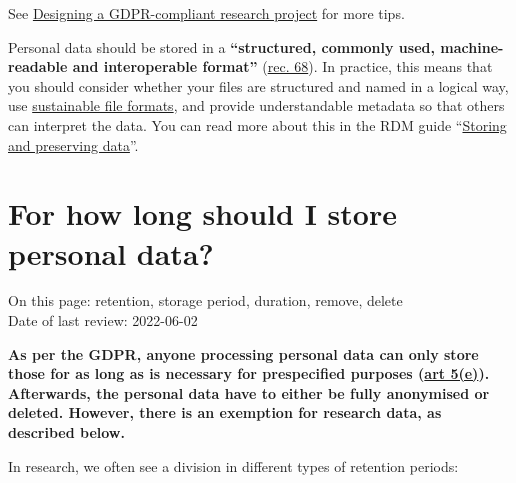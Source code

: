 \documentclass[
]{book}
\begin{document}
See \protect\hyperlink{privacy-by-design}{Designing a GDPR-compliant research project} for more tips.

Personal data should be stored in a \textbf{``structured, commonly used, machine-readable
and interoperable format''} (\href{https://gdpr.eu/Recital-68-Right-of-data-portability/}{rec. 68}).
In practice, this means that you should consider whether your files are
structured and named in a logical way, use
\href{https://dans.knaw.nl/en/file-formats/}{sustainable file formats},
and provide understandable metadata so that others can interpret the data.
You can read more about this in the RDM guide
``\href{https://www.uu.nl/en/research/research-data-management/guides/storing-and-preserving-data}{Storing and preserving data}''.

\hypertarget{data-storage-duration}{%
\section{For how long should I store personal data?}\label{data-storage-duration}}

On this page: retention, storage period, duration, remove, delete\\
Date of last review: 2022-06-02

\textbf{As per the GDPR, anyone processing personal data can only store those for as
long as is necessary for prespecified purposes
(\href{https://gdpr-info.eu/art-5-gdpr/}{art 5(e)}).
Afterwards, the personal data have to either be fully anonymised or deleted.
However, there is an exemption for research data, as described below.}

In research, we often see a division in different types of retention periods:
\end{document}
